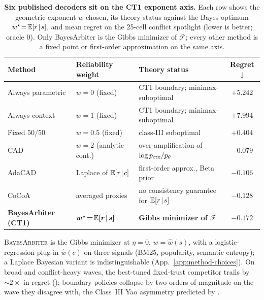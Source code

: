 \begin{table}[!htbp]
\centering\small
\caption{\textbf{Six published decoders sit on the CT1 exponent axis.} Each row shows the geometric exponent $w$ chosen, its theory status against the Bayes optimum $w^\star\!=\!\mathbb{E}[r\!\mid\!s]$, and mean regret on the 25-cell conflict spotlight (lower is better; oracle $0$). Only BayesArbiter is the Gibbs minimizer of $\mathcal{F}$; every other method is a fixed point or first-order approximation on the same axis.}
\label{tab:ct1-axis}
\setlength{\tabcolsep}{4pt}
\renewcommand{\arraystretch}{1.05}
\begin{tabular}{l l l c}
\toprule
\textbf{Method} & \textbf{Reliability weight} & \textbf{Theory status} & \textbf{Regret$\downarrow$} \\
\midrule
Always parametric & $w\!=\!0$ (fixed) & CT1 boundary; minimax-suboptimal & $+5.242$ \\
Always context & $w\!=\!1$ (fixed) & CT1 boundary; minimax-suboptimal & $+7.994$ \\
Fixed $50/50$ & $w\!=\!0.5$ (fixed) & class-III suboptimal & $+0.404$ \\
CAD~\citep{shi2024cad} & $w\!=\!2$ (analytic cont.) & over-amplification of $\log p_{\mathrm{ctx}}/p_\theta$ & $-0.079$ \\
AdaCAD~\citep{wang2025adacad} & Laplace of $\mathbb{E}[r\!\mid\!c]$ & first-order approx., Beta prior & $-0.106$ \\
CoCoA~\citep{khandelwal2025cocoa} & averaged proxies & no consistency guarantee for $\mathbb{E}[r\!\mid\!s]$ & $-0.128$ \\
\midrule
\rowcolor[gray]{0.92}
\textbf{BayesArbiter (CT1)} & $\boldsymbol{w^\star\!=\!\mathbb{E}[r\!\mid\!s]}$ & \textbf{Gibbs minimizer of $\mathcal{F}$} & $\boldsymbol{-0.172}$ \\
\bottomrule
\end{tabular}
\end{table}

\textsc{BayesArbiter} is the Gibbs minimizer at $\eta\!=\!0$, $w\!=\!\hat w(s)$, with a logistic-regression plug-in $\hat w(c)$ on three signals (BM25, popularity, semantic entropy); a Laplace Bayesian variant is indistinguishable (App.~\ref{app:method-choices}). On broad and conflict-heavy waves, the best-tuned fixed-trust competitor trails by $\sim\!2\times$ in regret (); boundary policies collapse by two orders of magnitude on the wave they disagree with, the Class~III Yao asymmetry predicted by .

